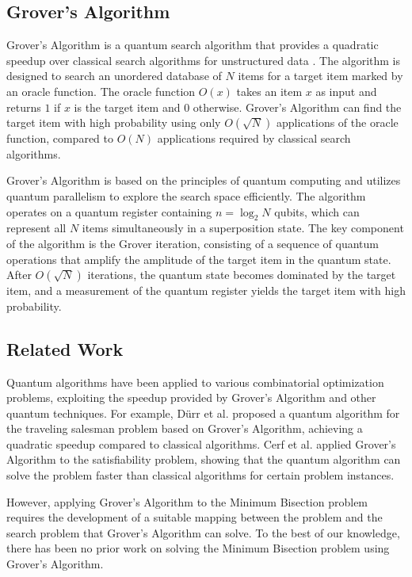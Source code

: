 \subsection{Grover's Algorithm}
Grover's Algorithm is a quantum search algorithm that provides a quadratic speedup over classical search algorithms for unstructured data \cite{grover1996fast}. The algorithm is designed to search an unordered database of $N$ items for a target item marked by an oracle function. The oracle function $O(x)$ takes an item $x$ as input and returns $1$ if $x$ is the target item and $0$ otherwise. Grover's Algorithm can find the target item with high probability using only $O(\sqrt{N})$ applications of the oracle function, compared to $O(N)$ applications required by classical search algorithms.

Grover's Algorithm is based on the principles of quantum computing and utilizes quantum parallelism to explore the search space efficiently. The algorithm operates on a quantum register containing $n = \log_2 N$ qubits, which can represent all $N$ items simultaneously in a superposition state. The key component of the algorithm is the Grover iteration, consisting of a sequence of quantum operations that amplify the amplitude of the target item in the quantum state. After $O(\sqrt{N})$ iterations, the quantum state becomes dominated by the target item, and a measurement of the quantum register yields the target item with high probability.

\subsection{Related Work}
Quantum algorithms have been applied to various combinatorial optimization problems, exploiting the speedup provided by Grover's Algorithm and other quantum techniques. For example, D\"urr et al. \cite{durr1996quantum} proposed a quantum algorithm for the traveling salesman problem based on Grover's Algorithm, achieving a quadratic speedup compared to classical algorithms. Cerf et al. \cite{cerf1998quantum} applied Grover's Algorithm to the satisfiability problem, showing that the quantum algorithm can solve the problem faster than classical algorithms for certain problem instances.

However, applying Grover's Algorithm to the Minimum Bisection problem requires the development of a suitable mapping between the problem and the search problem that Grover's Algorithm can solve. To the best of our knowledge, there has been no prior work on solving the Minimum Bisection problem using Grover's Algorithm.

